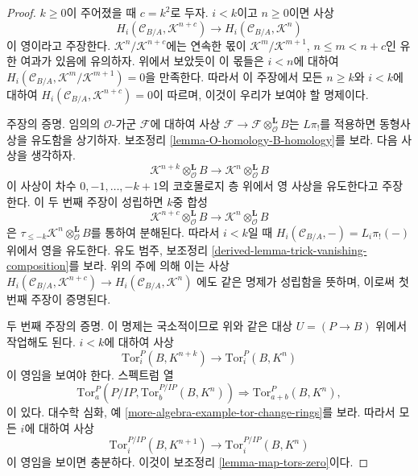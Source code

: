 \begin{proof}
\medskip\noindent
$k \geq 0$이 주어졌을 때 $c = k^2$로 두자. $i < k$이고 $n \geq 0$이면
사상
$$
H_i(\mathcal{C}_{B/A}, \mathcal{K}^{n + c}) \to
H_i(\mathcal{C}_{B/A}, \mathcal{K}^n)
$$
이 영이라고 주장한다. $\mathcal{K}^n/\mathcal{K}^{n + c}$에는 연속한 몫이
$\mathcal{K}^m/\mathcal{K}^{m + 1}$, $n \leq m < n + c$인 유한 여과가
있음에 유의하자. 위에서 보았듯이 이 몫들은 $i < n$에 대하여
$H_i(\mathcal{C}_{B/A}, \mathcal{K}^m/\mathcal{K}^{m + 1}) = 0$을
만족한다. 따라서 이 주장에서 모든 $n \geq k$와 $i < k$에 대하여
$H_i(\mathcal{C}_{B/A}, \mathcal{K}^{n + c}) = 0$이 따르며, 이것이
우리가 보여야 할 명제이다.

\medskip\noindent
주장의 증명. 임의의 $\mathcal{O}$-가군 $\mathcal{F}$에 대하여 사상
$\mathcal{F} \to \mathcal{F} \otimes_\mathcal{O}^\mathbf{L} B$는
$L\pi_!$를 적용하면 동형사상을 유도함을 상기하자. 보조정리
\ref{lemma-O-homology-B-homology}를 보라. 다음 사상을 생각하자.
$$
\mathcal{K}^{n + k} \otimes_\mathcal{O}^\mathbf{L} B
\longrightarrow
\mathcal{K}^n \otimes_\mathcal{O}^\mathbf{L} B
$$
이 사상이 차수 $0, -1, \ldots, - k + 1$의 코호몰로지 층 위에서 영
사상을 유도한다고 주장한다. 이 두 번째 주장이 성립하면 $k$중 합성
$$
\mathcal{K}^{n + c} \otimes_\mathcal{O}^\mathbf{L} B
\longrightarrow
\mathcal{K}^n \otimes_\mathcal{O}^\mathbf{L} B
$$
은 $\tau_{\leq -k}\mathcal{K}^n \otimes_\mathcal{O}^\mathbf{L} B$를 통하여
분해된다. 따라서 $i < k$일 때
$H_i(\mathcal{C}_{B/A}, -) = L_i\pi_!( - )$ 위에서 영을 유도한다. 유도
범주, 보조정리 \ref{derived-lemma-trick-vanishing-composition}를 보라. 위의
주에 의해 이는 사상
$H_i(\mathcal{C}_{B/A}, \mathcal{K}^{n + c}) \to
H_i(\mathcal{C}_{B/A}, \mathcal{K}^n)$
에도 같은 명제가 성립함을 뜻하며, 이로써 첫 번째 주장이 증명된다.

\medskip\noindent
두 번째 주장의 증명. 이 명제는 국소적이므로 위와 같은 대상
$U = (P \to B)$ 위에서 작업해도 된다. $i < k$에 대하여 사상
$$
\text{Tor}_i^P(B, K^{n + k}) \to \text{Tor}_i^P(B, K^n)
$$
이 영임을 보여야 한다. 스펙트럼 열
$$
\text{Tor}_a^P(P/IP, \text{Tor}_b^{P/IP}(B, K^n))
\Rightarrow
\text{Tor}_{a + b}^P(B, K^n),
$$
이 있다. 대수학 심화, 예 \ref{more-algebra-example-tor-change-rings}를
보라. 따라서 모든 $i$에 대하여 사상
$$
\text{Tor}_i^{P/IP}(B, K^{n + 1}) \to \text{Tor}_i^{P/IP}(B, K^n)
$$
이 영임을 보이면 충분하다. 이것이 보조정리
\ref{lemma-map-tors-zero}이다.
\end{proof}


